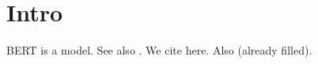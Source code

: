 \documentclass{article}
\begin{document}
\section{Intro}
BERT \cite{} is a model. See also \citep{?}.
We cite \citet{TODO} here.
Also \cite{smith2020bert} (already filled).
\end{document}
